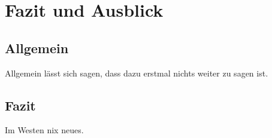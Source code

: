 \chapter{Fazit und Ausblick}
\label{chap:fazit}

\section{Allgemein}
Allgemein lässt sich sagen, dass dazu erstmal nichts weiter zu sagen ist.

\section{Fazit}
Im Westen nix neues.